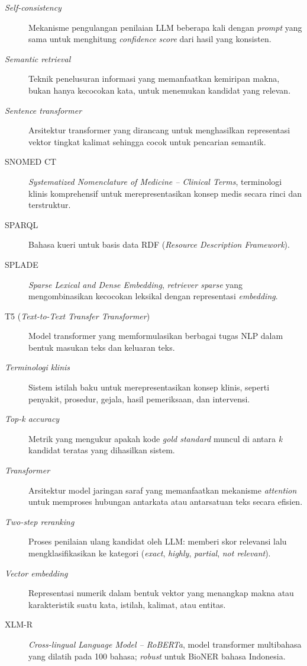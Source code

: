 {\begin{description}
    \item[\textit{Self-consistency}] Mekanisme pengulangan penilaian LLM beberapa kali dengan \textit{prompt} yang sama untuk menghitung \textit{confidence score} dari hasil yang konsisten.

    \item[\textit{Semantic retrieval}] Teknik penelusuran informasi yang memanfaatkan kemiripan makna, bukan hanya kecocokan kata, untuk menemukan kandidat yang relevan.

    \item[\textit{Sentence transformer}] Arsitektur transformer yang dirancang untuk menghasilkan representasi vektor tingkat kalimat sehingga cocok untuk pencarian semantik.

    \item[SNOMED CT] \textit{Systematized Nomenclature of Medicine -- Clinical Terms}, terminologi klinis komprehensif untuk merepresentasikan konsep medis secara rinci dan terstruktur.

    \item[SPARQL] Bahasa kueri untuk basis data RDF (\textit{Resource Description Framework}).

    \item[SPLADE] \textit{Sparse Lexical and Dense Embedding}, \textit{retriever sparse} yang mengombinasikan kecocokan leksikal dengan representasi \textit{embedding}.

    \item[T5 (\textit{Text-to-Text Transfer Transformer})] Model transformer yang memformulasikan berbagai tugas NLP dalam bentuk masukan teks dan keluaran teks.

    \item[\textit{Terminologi klinis}] Sistem istilah baku untuk merepresentasikan konsep klinis, seperti penyakit, prosedur, gejala, hasil pemeriksaan, dan intervensi.

    \item[\textit{Top-k accuracy}] Metrik yang mengukur apakah kode \textit{gold standard} muncul di antara \textit{k} kandidat teratas yang dihasilkan sistem.

    \item[\textit{Transformer}] Arsitektur model jaringan saraf yang memanfaatkan mekanisme \textit{attention} untuk memproses hubungan antarkata atau antarsatuan teks secara efisien.

    \item[\textit{Two-step reranking}] Proses penilaian ulang kandidat oleh LLM: memberi skor relevansi lalu mengklasifikasikan ke kategori (\textit{exact}, \textit{highly}, \textit{partial}, \textit{not relevant}).

    \item[\textit{Vector embedding}] Representasi numerik dalam bentuk vektor yang menangkap makna atau karakteristik suatu kata, istilah, kalimat, atau entitas.

    \item[XLM-R] \textit{Cross-lingual Language Model -- RoBERTa}, model transformer multibahasa yang dilatih pada 100 bahasa; \textit{robust} untuk BioNER bahasa Indonesia.

\end{description}
}